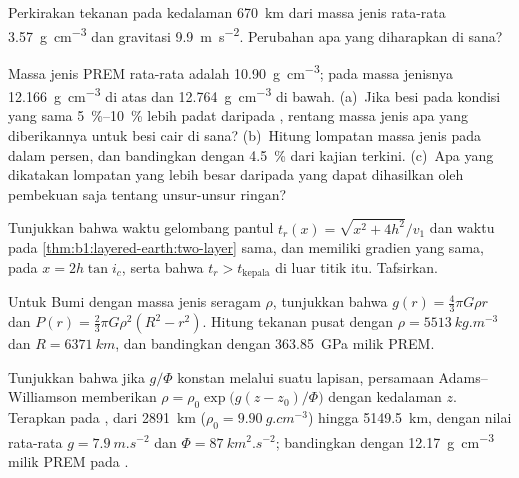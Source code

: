 \begin{exercise}[$\star\star$]\label{exo:b1:layered-earth:8}
Perkirakan tekanan pada kedalaman \qty{670}{km} dari massa jenis rata-rata \qty{3.57}{g.cm^{-3}} dan gravitasi \qty{9.9}{m.s^{-2}}. Perubahan  apa yang diharapkan di sana?
\end{exercise}

\begin{exercise}[$\star\star$]\label{exo:b1:layered-earth:9}
Massa jenis  PREM rata-rata adalah \qty{10.90}{g.cm^{-3}}; pada  massa jenisnya \qty{12.166}{g.cm^{-3}} di atas dan \qty{12.764}{g.cm^{-3}} di bawah. (a)~Jika besi pada kondisi yang sama \qtyrange{5}{10}{\percent} lebih padat daripada , rentang massa jenis apa yang diberikannya untuk besi cair di sana? (b)~Hitung lompatan massa jenis pada  dalam persen, dan bandingkan dengan \qty{4.5}{\percent} dari kajian terkini. (c)~Apa yang dikatakan lompatan yang lebih besar daripada yang dapat dihasilkan oleh pembekuan saja tentang unsur-unsur ringan?
\end{exercise}

\begin{exercise}[$\star\star\star$]\label{exo:b1:layered-earth:10}
Tunjukkan bahwa waktu gelombang pantul $t_r(x) = \sqrt{x^2 + 4h^2}/v_1$ dan waktu  pada \cref{thm:b1:layered-earth:two-layer} sama, dan memiliki gradien yang sama, pada $x = 2h\tan i_c$, serta bahwa $t_r > t_{\text{kepala}}$ di luar titik itu. Tafsirkan.
\end{exercise}

\begin{exercise}[$\star\star\star$]\label{exo:b1:layered-earth:11}
Untuk Bumi dengan massa jenis seragam $\rho$, tunjukkan bahwa $g(r) = \tfrac43\pi G\rho r$ dan $P(r) = \tfrac23\pi G\rho^2(R^2 - r^2)$. Hitung tekanan pusat dengan $\rho = \qty{5513}{kg.m^{-3}}$ dan $R = \qty{6371}{km}$, dan bandingkan dengan \qty{363.85}{GPa} milik PREM.
\end{exercise}

\begin{exercise}[$\star\star\star$]\label{exo:b1:layered-earth:12}
Tunjukkan bahwa jika $g/\Phi$ konstan melalui suatu lapisan, persamaan Adams--Williamson memberikan $\rho = \rho_0\exp\bigl(g(z - z_0)/\Phi\bigr)$ dengan kedalaman $z$. Terapkan pada , dari \qty{2891}{km} ($\rho_0 =
\qty{9.90}{g.cm^{-3}}$) hingga \qty{5149.5}{km}, dengan nilai rata-rata $g = \qty{7.9}{m.s^{-2}}$ dan $\Phi = \qty{87}{km^2.s^{-2}}$; bandingkan dengan \qty{12.17}{g.cm^{-3}} milik PREM pada .
\end{exercise}


